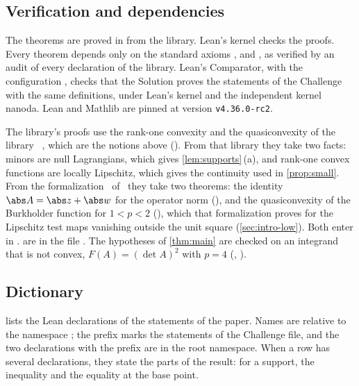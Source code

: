 \subsection{Verification and dependencies}\label{app:formal-check}

{\sloppy
The theorems are proved in  from the library.
Lean's kernel checks the proofs. Every theorem depends only on the standard axioms ,
 and , as verified by an audit of every declaration of
the library. Lean's Comparator, with the configuration
, checks that the Solution proves the
statements of the Challenge with the same definitions, under Lean's kernel and the independent
kernel nanoda. Lean and Mathlib are pinned at version \texttt{v4.36.0-rc2}.\par}

\begin{sloppypar}
The library's proofs use the rank-one convexity and the quasiconvexity of the library
~\cite{CoVLean}, which are the notions above
(). From that library they take two facts: minors
are null Lagrangians, which gives \cref{lem:supports}\,(a), and rank-one convex functions are
locally Lipschitz, which gives the continuity used in \cref{prop:small}. From the
formalization~\cite{IwaniecLean} of~\cite{SharpHI} they take two theorems: the identity
$\abs A=\abs z+\abs w$ for the operator norm (), and the quasiconvexity
of the Burkholder function for $1<p<2$ (), which that
formalization proves for the Lipschitz test maps vanishing outside the unit square
(\cref{sec:intro-low}). Both enter in .
 are in the file
. The hypotheses of \cref{thm:main} are
checked on an integrand that is not convex, $F(A)=(\det A)^2$ with $p=4$
(, ).
\end{sloppypar}

\subsection{Dictionary}\label{app:formal-dictionary}

{\sloppy
{} lists the Lean declarations of the statements of the paper. Names
are relative to the namespace ; the prefix
 marks the statements of the Challenge file, and the two
declarations with the prefix  are in the root namespace. When a row has several
declarations, they state the parts of the result: for a support, the inequality and the equality
at the base point.\par}

